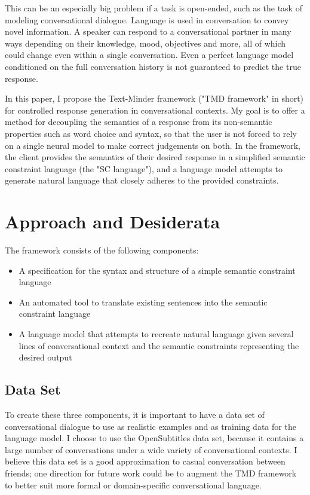 \documentclass{article}
\numberwithin{equation}{section}
\begin{document}
This can be an especially big problem if a task is open-ended, such as the task of modeling conversational dialogue. Language is used in conversation to convey novel information. A speaker can respond to a conversational partner in many ways depending on their knowledge, mood, objectives and more, all of which could change even within a single conversation. Even a perfect language model conditioned on the full conversation history is not guaranteed to predict the true response.

In this paper, I propose the Text-Minder framework ("TMD framework" in short) for controlled response generation in conversational contexts. My goal is to offer a method for decoupling the semantics of a response from its non-semantic properties such as word choice and syntax, so that the user is not forced to rely on a single neural model to make correct judgements on both. In the framework, the client provides the semantics of their desired response in a simplified semantic constraint language (the "SC language"), and a language model attempts to generate natural language that closely adheres to the provided constraints.

\section{Approach and Desiderata}

The framework consists of the following components:

\begin{itemize}[topsep=0pt, partopsep=0pt, itemsep=2pt, parsep=0pt]
\item A specification for the syntax and structure of a simple semantic constraint language
\item An automated tool to translate existing sentences into the semantic constraint language
\item A language model that attempts to recreate natural language given several lines of conversational context and the semantic constraints representing the desired output
\end{itemize}

\subsection{Data Set}

To create these three components, it is important to have a data set of conversational dialogue to use as realistic examples and as training data for the language model. I choose to use the OpenSubtitles \cite{opensubtitles} data set, because it contains a large number of conversations under a wide variety of conversational contexts. I believe this data set is a good approximation to casual conversation between friends; one direction for future work could be to augment the TMD framework to better suit more formal or domain-specific conversational language.
\end{document}

